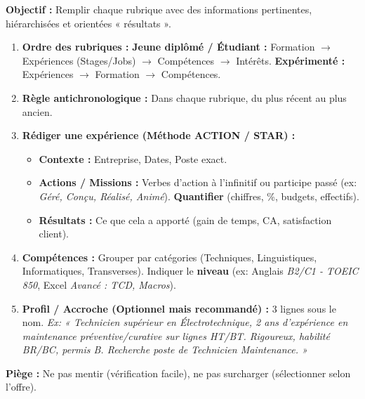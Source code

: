 \documentclass[11pt]{article}
\begin{document}
\begin{methode}
    \textbf{Objectif :} Remplir chaque rubrique avec des informations pertinentes, hiérarchisées et orientées « résultats ».
    \begin{enumerate}
        \item \textbf{Ordre des rubriques :} \textbf{Jeune diplômé / Étudiant :} Formation $\to$ Expériences (Stages/Jobs) $\to$ Compétences $\to$ Intérêts. \textbf{Expérimenté :} Expériences $\to$ Formation $\to$ Compétences.
        \item \textbf{Règle antichronologique :} Dans chaque rubrique, du plus récent au plus ancien.
        \item \textbf{Rédiger une expérience (Méthode ACTION / STAR) :}
            \begin{itemize}
                \item \textbf{Contexte :} Entreprise, Dates, Poste exact.
                \item \textbf{Actions / Missions :} Verbes d'action à l'infinitif ou participe passé (ex: \emph{Géré, Conçu, Réalisé, Animé}). \textbf{Quantifier} (chiffres, \%, budgets, effectifs).
                \item \textbf{Résultats :} Ce que cela a apporté (gain de temps, CA, satisfaction client).
            \end{itemize}
        \item \textbf{Compétences :} Grouper par catégories (Techniques, Linguistiques, Informatiques, Transverses). Indiquer le \textbf{niveau} (ex: Anglais \emph{B2/C1 - TOEIC 850}, Excel \emph{Avancé : TCD, Macros}).
        \item \textbf{Profil / Accroche (Optionnel mais recommandé) :} 3 lignes sous le nom. \emph{Ex: « Technicien supérieur en Électrotechnique, 2 ans d'expérience en maintenance préventive/curative sur lignes HT/BT. Rigoureux, habilité BR/BC, permis B. Recherche poste de Technicien Maintenance. »}
    \end{enumerate}
    \textbf{Piège :} Ne pas mentir (vérification facile), ne pas surcharger (sélectionner selon l'offre).
\end{methode}
\end{document}
